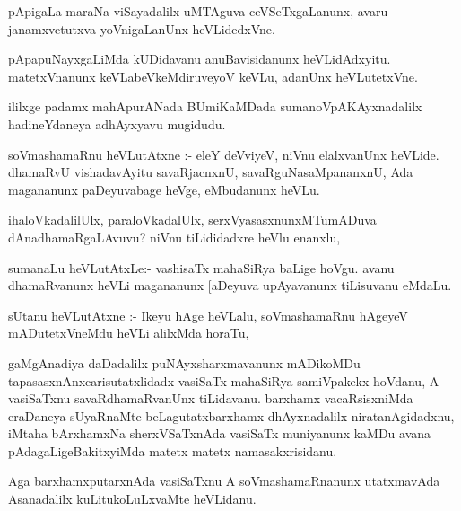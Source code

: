 \documentclass{article}
\begin{document}
\begin{mn}
pApigaLa maraNa viSayadalilx  uMTAguva  ceVSeTxgaLanunx, avaru janamxvetutxva 
yoVnigaLanUnx heVLidedxVne.
\end{mn}

\begin{mn}
pApapuNayxgaLiMda kUDidavanu anuBavisidanunx  heVLidAdxyitu.  
matetxVnanunx  keVLabeVkeMdiruveyoV keVLu, adanUnx heVLutetxVne.
\end{mn}

\begin{mn}
ililxge padamx mahApurANada BUmiKaMDada  sumanoVpAKAyxnadalilx hadineYdaneya  adhAyxyavu mugidudu.
\end{mn}


\begin{mn}
soVmashamaRnu heVLutAtxne :- eleY deVviyeV, niVnu  elalxvanUnx  heVLide. 
dhamaRvU  vishadavAyitu savaRjacnxnU,  savaRguNasaMpananxnU, Ada magananunx 
paDeyuvabage heVge, eMbudanunx heVLu.
\end{mn}

\begin{mn}
ihaloVkadalilUlx, paraloVkadalUlx, serxVyasasxnunxMTumADuva dAnadhamaRgaLAvuvu?  
niVnu tiLididadxre heVlu enanxlu,
\end{mn}

\begin{mn}
sumanaLu heVLutAtxLe:- vashisaTx mahaSiRya baLige hoVgu. avanu dhamaRvanunx 
heVLi magananunx [aDeyuva upAyavanunx tiLisuvanu eMdaLu.
\end{mn}

\begin{mn}
sUtanu heVLutAtxne :- Ikeyu hAge heVLalu, soVmashamaRnu hAgeyeV mADutetxVneMdu 
heVLi alilxMda horaTu, 
\end{mn}

\begin{mn}
gaMgAnadiya daDadalilx puNAyxsharxmavanunx mADikoMDu tapasasxnAnxcarisutatxlidadx 
vasiSaTx mahaSiRya samiVpakekx hoVdanu, A vasiSaTxnu savaRdhamaRvanUnx  tiLidavanu.  
barxhamx vacaRsisxniMda eraDaneya sUyaRnaMte  beLagutatxbarxhamx dhAyxnadalilx  
niratanAgidadxnu, iMtaha bArxhamxNa sherxVSaTxnAda vasiSaTx muniyanunx kaMDu avana 
pAdagaLigeBakitxyiMda matetx matetx namasakxrisidanu. 
\end{mn}

\begin{mn}
Aga barxhamxputarxnAda vasiSaTxnu A soVmashamaRnanunx  utatxmavAda Asanadalilx kuLitukoLuLxvaMte heVLidanu.
\end{mn}
\end{document}
